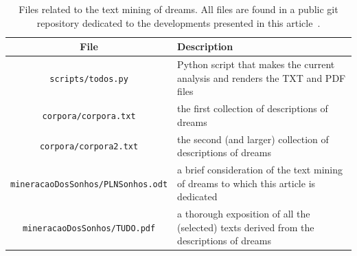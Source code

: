 \documentclass[12pt,fleqn]{article}
\begin{document}
\begin{table}[H] %
	\caption{Files related to the text mining of dreams.
	All files are found in a public git repository dedicated to the developments presented in this article~\citep{repo}.}\label{tab:files}
\vspace{12pt}
\centering{}
	\begin{tabular}{  c | p{8cm} }
	\textbf{File}           & \textbf{Description} \\\hline
	\texttt{scripts/todos.py}  & Python script that makes the current analysis and renders the TXT and PDF files     \\
	\texttt{corpora/corpora.txt}  & the first collection of descriptions of dreams \\
		\texttt{corpora/corpora2.txt}  & the second (and larger) collection of descriptions of dreams      \\
	\texttt{mineracaoDosSonhos/PLNSonhos.odt}  & a brief consideration of the text mining of dreams to which this article is dedicated  \\
		\texttt{mineracaoDosSonhos/TUDO.pdf}  & a thorough exposition of all the (selected) texts derived from the descriptions of dreams  \\
\end{tabular}
\end{table}
 




\newpage %

\vspace{12cm}
\end{document}
